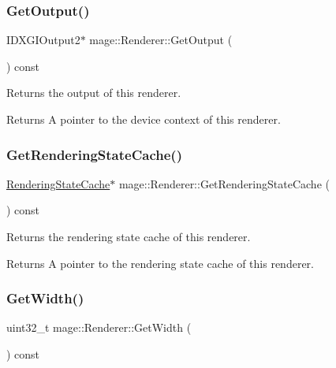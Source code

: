 \subsubsection{\texorpdfstring{Get\+Output()}{GetOutput()}}
{\footnotesize\ttfamily I\+D\+X\+G\+I\+Output2$\ast$ mage\+::\+Renderer\+::\+Get\+Output (\begin{DoxyParamCaption}{ }\end{DoxyParamCaption}) const\hspace{0.3cm}{\ttfamily [noexcept]}}

Returns the output of this renderer.

\begin{DoxyReturn}{Returns}
A pointer to the device context of this renderer. 
\end{DoxyReturn}
\hypertarget{classmage_1_1_renderer_a5e48da6152df0ddfa52c079f77ee6873}{}\label{classmage_1_1_renderer_a5e48da6152df0ddfa52c079f77ee6873} 
\subsubsection{\texorpdfstring{Get\+Rendering\+State\+Cache()}{GetRenderingStateCache()}}
{\footnotesize\ttfamily \hyperlink{structmage_1_1_rendering_state_cache}{Rendering\+State\+Cache}$\ast$ mage\+::\+Renderer\+::\+Get\+Rendering\+State\+Cache (\begin{DoxyParamCaption}{ }\end{DoxyParamCaption}) const\hspace{0.3cm}{\ttfamily [noexcept]}}

Returns the rendering state cache of this renderer.

\begin{DoxyReturn}{Returns}
A pointer to the rendering state cache of this renderer. 
\end{DoxyReturn}
\hypertarget{classmage_1_1_renderer_a140938e7d5f576163d39ce249ebda99f}{}\label{classmage_1_1_renderer_a140938e7d5f576163d39ce249ebda99f} 
\subsubsection{\texorpdfstring{Get\+Width()}{GetWidth()}}
{\footnotesize\ttfamily uint32\+\_\+t mage\+::\+Renderer\+::\+Get\+Width (\begin{DoxyParamCaption}{ }\end{DoxyParamCaption}) const\hspace{0.3cm}{\ttfamily [noexcept]}}

